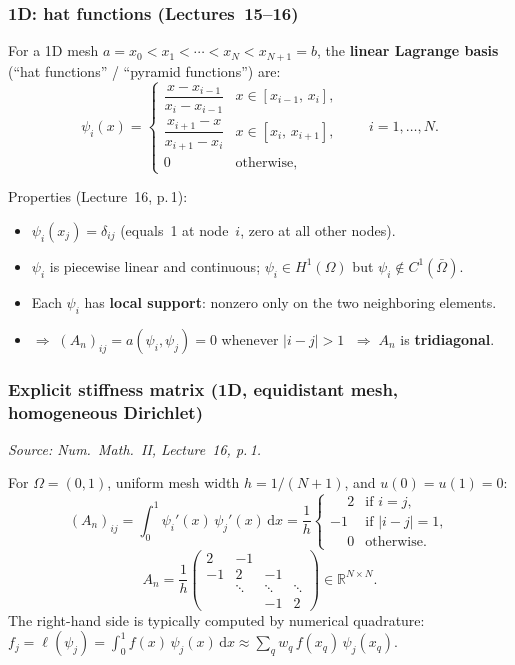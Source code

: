 \documentclass[11pt,a4paper]{article}
\theoremstyle{plain}
\theoremstyle{remark}
\newcommand{\R}{\mathbb{R}}
\newcommand{\dx}{\,\mathrm{d}x}
\let\origsubsubsection\subsubsection
\renewcommand{\subsubsection}{\needspace{5\baselineskip}\origsubsubsection}
\begin{document}
\subsubsection{1D: hat functions (Lectures~15--16)}

For a 1D mesh $a = x_0 < x_1 < \cdots < x_N < x_{N+1} = b$, the
\textbf{linear Lagrange basis} (``hat functions'' / ``pyramid functions'')
are:
\[
  \psi_i(x) = \begin{cases}
    \dfrac{x - x_{i-1}}{x_i - x_{i-1}}
      & x \in [x_{i-1},\, x_i],\\[8pt]
    \dfrac{x_{i+1} - x}{x_{i+1} - x_i}
      & x \in [x_i,\, x_{i+1}],\\[8pt]
    0 & \text{otherwise},
  \end{cases}
  \qquad i = 1,\ldots,N.
\]

Properties (Lecture~16, p.\,1):
\begin{itemize}[nosep]
  \item $\psi_i(x_j) = \delta_{ij}$
        (equals~1 at node~$i$, zero at all other nodes).
  \item $\psi_i$ is piecewise linear and continuous;
        $\psi_i \in H^1(\Omega)$ but $\psi_i \notin C^1(\bar\Omega)$.
  \item Each $\psi_i$ has \textbf{local support}: nonzero only on the
        two neighboring elements.
  \item $\Rightarrow\;(A_n)_{ij} = a(\psi_i,\psi_j) = 0$
        whenever $|i - j| > 1$
        $\;\Rightarrow\; A_n$ is \textbf{tridiagonal}.
\end{itemize}

\subsubsection{Explicit stiffness matrix
              (1D, equidistant mesh, homogeneous Dirichlet)}

\textit{Source: Num.\ Math.\ II, Lecture~16, p.\,1.}

\medskip\noindent
For $\Omega = (0,1)$, uniform mesh width $h = 1/(N+1)$, and $u(0) = u(1) = 0$:
\[
  (A_n)_{ij}
  = \int_0^1 \psi_i'(x)\,\psi_j'(x)\dx
  = \frac{1}{h}
  \begin{cases}
    \phantom{-}2  & \text{if } i = j,\\
    -1            & \text{if } |i-j| = 1,\\
    \phantom{-}0  & \text{otherwise}.
  \end{cases}
\]
\[
  A_n = \frac{1}{h}\begin{pmatrix}
    2 & -1 & & \\
    -1 & 2 & -1 & \\
    & \ddots & \ddots & \ddots \\
    & & -1 & 2
  \end{pmatrix} \in \R^{N \times N}.
\]
The right-hand side is typically computed by numerical quadrature:
$f_j = \ell(\psi_j) = \int_0^1 f(x)\,\psi_j(x)\dx
\approx \sum_q w_q\, f(x_q)\,\psi_j(x_q)$.
\end{document}
